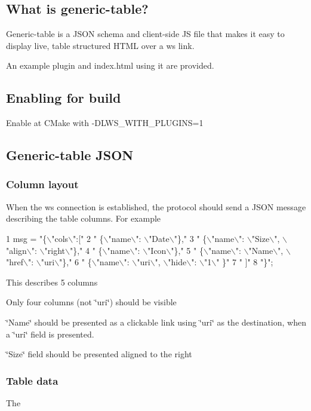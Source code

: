 \subsection*{What is generic-\/table? }

Generic-\/table is a J\+S\+ON schema and client-\/side JS file that makes it easy to display live, table structured H\+T\+ML over a ws link.

An example plugin and index.\+html using it are provided.

\subsection*{Enabling for build }

Enable at C\+Make with -\/\+D\+L\+W\+S\+\_\+\+W\+I\+T\+H\+\_\+\+P\+L\+U\+G\+I\+NS=1

\subsection*{Generic-\/table J\+S\+ON }

\subsubsection*{Column layout}

When the ws connection is established, the protocol should send a J\+S\+ON message describing the table columns. For example


\begin{DoxyCode}
1 msg = "\{\(\backslash\)"cols\(\backslash\)":["
2       "  \{\(\backslash\)"name\(\backslash\)": \(\backslash\)"Date\(\backslash\)"\},"
3       "  \{\(\backslash\)"name\(\backslash\)": \(\backslash\)"Size\(\backslash\)", \(\backslash\)"align\(\backslash\)": \(\backslash\)"right\(\backslash\)"\},"
4       "  \{\(\backslash\)"name\(\backslash\)": \(\backslash\)"Icon\(\backslash\)"\},"
5       "  \{\(\backslash\)"name\(\backslash\)": \(\backslash\)"Name\(\backslash\)", \(\backslash\)"href\(\backslash\)": \(\backslash\)"uri\(\backslash\)"\},"
6       "  \{\(\backslash\)"name\(\backslash\)": \(\backslash\)"uri\(\backslash\)", \(\backslash\)"hide\(\backslash\)": \(\backslash\)"1\(\backslash\)" \}"
7       " ]"
8       "\}";
\end{DoxyCode}



\begin{DoxyItemize}
\item This describes 5 columns
\item Only four columns (not \char`\"{}uri\char`\"{}) should be visible
\item \char`\"{}\+Name\char`\"{} should be presented as a clickable link using \char`\"{}uri\char`\"{} as the destination, when a \char`\"{}uri\char`\"{} field is presented.
\item \char`\"{}\+Size\char`\"{} field should be presented aligned to the right
\end{DoxyItemize}

\subsubsection*{Table data}

The 